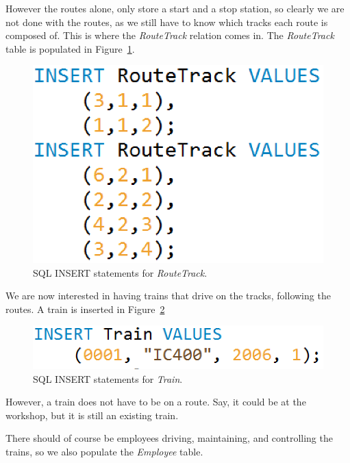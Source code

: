 However the routes alone, only store a start and a stop station, so clearly we 
are not done with the routes, as we still have to know which tracks each route 
is composed of. This is where the \emph{RouteTrack} relation comes in. The 
\emph{RouteTrack} table is populated in Figure~\ref{fig:ins:routetrack}.

\begin{figure}[h]
    \centering
    \includegraphics[scale=.5]{img/INSERT_Statements_RouteTrack}
    \caption{SQL INSERT statements for \emph{RouteTrack}.}
    \label{fig:ins:routetrack}
\end{figure}

We are now interested in having trains that drive on the tracks, following the 
routes. A train is inserted in Figure~\ref{fig:ins:train}

\begin{figure}[h]
    \centering
    \includegraphics[scale=.5]{img/INSERT_Statements_Train}
    \caption{SQL INSERT statements for \emph{Train}.}
    \label{fig:ins:train}
\end{figure}

However, a train does not have to be on a route. Say, it could be at the 
workshop, but it is still an existing train.

There should of course be employees driving, maintaining, and controlling the 
trains, so we also populate the \emph{Employee} table.

